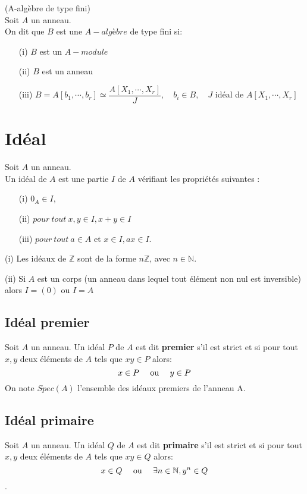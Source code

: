 \begin{madefinition}(A-algèbre de type fini)\\
	Soit $A$ un anneau. \\
	On dit que $B$ est une $A-algèbre$ de type fini si:
	\begin{enumerate}
		\item[(i)] $B$ est un $A-module$
		\item[(ii)] $B$ est un anneau
		\item[(iii)] $B = A [b_1, \cdots, b_r] \simeq \dfrac{A[X_1, \cdots, X_r]}{J}, \quad b_i \in B , \quad J$ idéal de $A[X_1, \cdots, X_r]$
	\end{enumerate}
\end{madefinition}
\section{Idéal}
\begin{madefinition}
	Soit $A$ un anneau.\\
	Un idéal de $A$ est une partie $I$ de $A$ vérifiant les propriétés suivantes : \\
	\begin{enumerate}
		\item[(i)] $0_A \in I$,
		\item[(ii)]$ pour \ tout \ x, y \in I, x+y \in I$
		\item[(iii)]$pour \ tout \ a \in A$ et $x \in I , ax \in I$.
	\end{enumerate}
\end{madefinition}
\begin{monexemple}
	\item[(i)] Les idéaux de $\mathbb{Z}$ sont de la forme $n\mathbb{Z}$, avec $n \in \mathbb{N}$.
	\item[(ii)] Si $A$ est un corps (un anneau dans lequel tout élément non nul est inversible) alors $I=(0)$ ou $I=A$
\end{monexemple}
\subsection{Idéal premier}
\begin{madefinition}
	Soit $A$ un anneau. Un idéal $P$ de $A$ est dit \textbf{premier} s'il est strict et si pour tout $x,y$ deux éléments de $A$ tels que $xy \in P$ alors: $$x \in P \text{ \quad ou \quad} y\in P$$
	On note $Spec(A)$  l'ensemble des idéaux premiers de l'anneau A. 
\end{madefinition}
\subsection{Idéal primaire}
\begin{madefinition}
	Soit $A$ un anneau. Un idéal $Q$ de $A$ est dit \textbf{primaire} s'il est strict et si pour tout $x,y$ deux éléments de $A$ tels que $xy \in Q$ alors: $$x \in Q \text{ \quad ou \quad} \exists n \in \mathbb{N}, y^{n} \in Q$$.
\end{madefinition}
